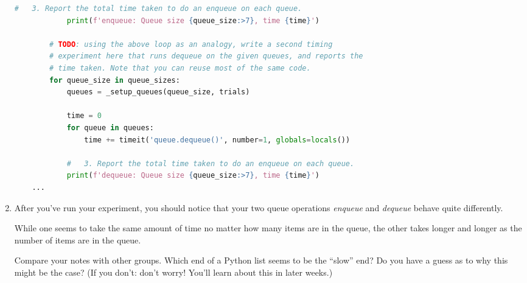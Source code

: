 \documentclass[12pt]{article}
\begin{document}
\begin{enumerate}[1.]
\begin{lstlisting}[language=Python,caption={task\_3\_q1\_solution.py},captionpos=b]
            #   3. Report the total time taken to do an enqueue on each queue.
            print(f'enqueue: Queue size {queue_size:>7}, time {time}')

        # TODO: using the above loop as an analogy, write a second timing
        # experiment here that runs dequeue on the given queues, and reports the
        # time taken. Note that you can reuse most of the same code.
        for queue_size in queue_sizes:
            queues = _setup_queues(queue_size, trials)

            time = 0
            for queue in queues:
                time += timeit('queue.dequeue()', number=1, globals=locals())

            #   3. Report the total time taken to do an enqueue on each queue.
            print(f'dequeue: Queue size {queue_size:>7}, time {time}')
    ...
    \end{lstlisting}

    \item After you’ve run your experiment, you should notice that your two queue
    operations \textit{enqueue} and \textit{dequeue} behave quite differently.

    \bigskip

    While one seems to take the same amount of time no matter how many items are
    in the queue, the other takes longer and longer as the number of items are in
    the queue.

    \bigskip

    Compare your notes with other groups.
    Which end of a Python list seems to be the “slow” end? Do you have a guess
    as to why this might be the case? (If you don't: don't worry! You'll learn
    about this in later weeks.)

\end{enumerate}
\end{document}
